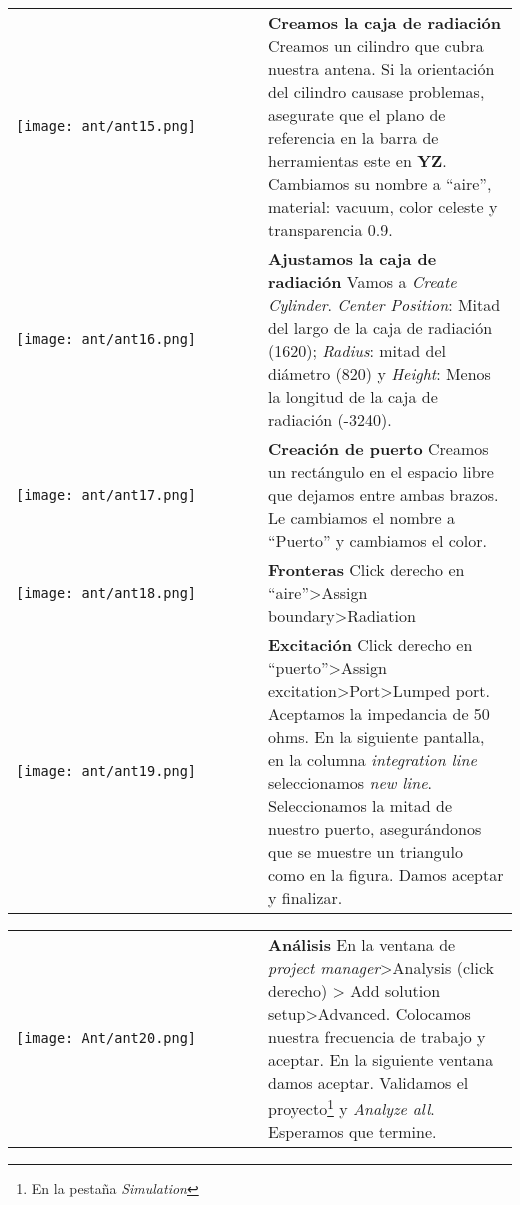 \documentclass[
	12pt, %
	fleqn, %
	a4paper, %
	oneside, %
]{LegrandOrangeBook}
\begin{document}
\begin{tabular}{k{0.5\linewidth}  j{0.5\linewidth}}
        \texttt{[image: ant/ant15.png]} & \textbf{Creamos la caja de radiación} \newline 
        Creamos un cilindro que cubra nuestra antena. Si la orientación del cilindro causase problemas, asegurate que el plano de referencia en la barra de herramientas este en \textbf{YZ}. Cambiamos su nombre a ``aire'', material: vacuum, color celeste y transparencia 0.9.\\
        \texttt{[image: ant/ant16.png]} & \textbf{Ajustamos la caja de radiación} \newline 
        Vamos a \textit{Create Cylinder}. \textit{Center Position}: Mitad del largo de la caja de radiación (1620); \textit{Radius}: mitad del diámetro (820) y \textit{Height}: Menos la longitud de la caja de radiación (-3240).\\
         \texttt{[image: ant/ant17.png]} & \textbf{Creación de puerto} \newline 
        Creamos un rectángulo en el espacio libre que dejamos entre ambas brazos. Le cambiamos el nombre a ``Puerto'' y cambiamos el color.\\
        \texttt{[image: ant/ant18.png]} & \textbf{Fronteras} \newline 
        Click derecho en ``aire''>Assign boundary>Radiation\\
        \texttt{[image: ant/ant19.png]} & \textbf{Excitación} \newline 
        Click derecho en ``puerto''>Assign excitation>Port>Lumped port. Aceptamos la impedancia de 50 ohms. En la siguiente pantalla, en la columna \textit{integration line} seleccionamos \textit{new line}. Seleccionamos la mitad de nuestro puerto, asegurándonos que se muestre un triangulo como en la figura. Damos aceptar y finalizar.\\
\end{tabular}
\begin{tabular}{k{0.5\linewidth}  j{0.5\linewidth}}
        \texttt{[image: Ant/ant20.png]} & \textbf{Análisis} \newline 
        En la ventana de \textit{project manager}>Analysis (click derecho) > Add solution setup>Advanced. Colocamos nuestra frecuencia de trabajo y aceptar. En la siguiente ventana damos aceptar. Validamos el proyecto\footnote{En la pestaña \textit{Simulation}} y \textit{Analyze all}. Esperamos que termine.
\end{tabular}
\end{document}
